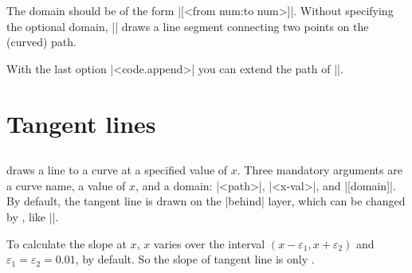 The domain should be of the form |[<from num:to num>]|.
Without specifying the optional domain, |\tzsecant| draws a line segment connecting two points on the (curved) path.

\begin{tzcode}{.3}
\end{tzcode}

With the last option |<code.append>| you can extend the path of |\tzsecantat|.

\begin{tzcode}{.3}
\end{tzcode}



\section{Tangent lines}
\label{s:tangent}

\subsection{\protect\cmd{\tztangentat}}
\label{ss:tztangentat}

\icmd{\tztangentat} draws a  line to a curve at a specified value of $x$. Three mandatory arguments are a curve name, a value of $x$, and a domain: |{<path>}|, |{<x-val>}|, and |[domain]|.
By default, the tangent line is drawn on the |behind| layer, which can be changed by \icmd{\settztangentlayer}, like ||.

\remark 
To calculate the slope at $x$, $x$ varies over the interval $(x-\varepsilon_1,x+\varepsilon_2)$ and $\varepsilon_1=\varepsilon_2=0.01$, by default.
So the slope of tangent line is only . 

